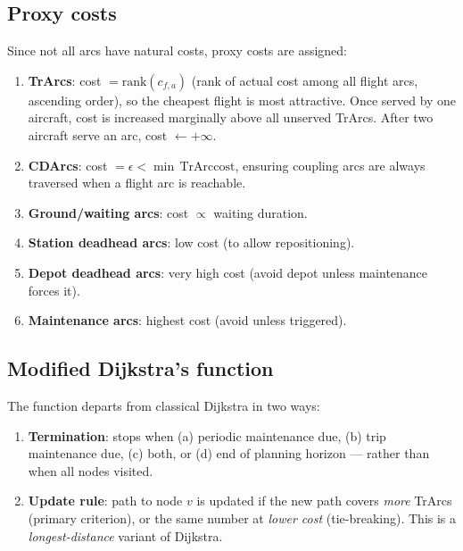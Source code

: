 \documentclass[11pt, a4paper]{article}
\theoremstyle{plain}
\theoremstyle{definition}
\theoremstyle{remark}
\begin{document}
\subsection{Proxy costs}

Since not all arcs have natural costs, proxy costs are assigned:
\begin{enumerate}[label=(\roman*)]
  \item \textbf{TrArcs}: cost $= \mathrm{rank}(c_{f,a})$ (rank of actual cost
    among all flight arcs, ascending order), so the cheapest flight is most
    attractive.  Once served by one aircraft, cost is increased marginally above
    all unserved TrArcs.  After two aircraft serve an arc, cost $\leftarrow
    +\infty$.
  \item \textbf{CDArcs}: cost $= \epsilon < \min\,\mathrm{TrArc cost}$, ensuring
    coupling arcs are always traversed when a flight arc is reachable.
  \item \textbf{Ground/waiting arcs}: cost $\propto$ waiting duration.
  \item \textbf{Station deadhead arcs}: low cost (to allow repositioning).
  \item \textbf{Depot deadhead arcs}: very high cost (avoid depot unless
    maintenance forces it).
  \item \textbf{Maintenance arcs}: highest cost (avoid unless triggered).
\end{enumerate}

\subsection{Modified Dijkstra's function}

The function departs from classical Dijkstra in two ways:
\begin{enumerate}[label=(\roman*)]
  \item \textbf{Termination}: stops when (a) periodic maintenance due, (b)
    trip maintenance due, (c) both, or (d) end of planning horizon — rather
    than when all nodes visited.
  \item \textbf{Update rule}: path to node $v$ is updated if the new path
    covers \emph{more} TrArcs (primary criterion), or the same number at
    \emph{lower cost} (tie-breaking).  This is a \emph{longest-distance} variant
    of Dijkstra.
\end{enumerate}
\end{document}
